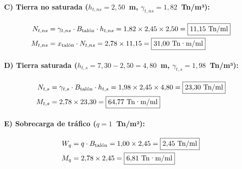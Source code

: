 \paragraph{C) Tierra no saturada ($h_{t,ns} = 2{,}50$~m, $\gamma_{t,ns} = 1{,}82$~Tn/m³):}

\begin{align*}
  N_{t,ns} &= \gamma_{t,ns} \cdot B_\text{talón} \cdot h_{t,ns}
            = 1{,}82 \times 2{,}45 \times 2{,}50
            = \boxed{11{,}15~\text{Tn/ml}} \\
  M_{t,ns} &= x_\text{talón} \cdot N_{t,ns}
            = 2{,}78 \times 11{,}15 = \boxed{31{,}00~\text{Tn·m/ml}}
\end{align*}

\paragraph{D) Tierra saturada ($h_{t,s} = 7{,}30 - 2{,}50 = 4{,}80$~m, $\gamma_{t,s} = 1{,}98$~Tn/m³):}

\begin{align*}
  N_{t,s} &= \gamma_{t,s} \cdot B_\text{talón} \cdot h_{t,s}
           = 1{,}98 \times 2{,}45 \times 4{,}80
           = \boxed{23{,}30~\text{Tn/ml}} \\
  M_{t,s} &= 2{,}78 \times 23{,}30 = \boxed{64{,}77~\text{Tn·m/ml}}
\end{align*}

\paragraph{E) Sobrecarga de tráfico ($q = 1$~Tn/m²):}

\begin{align*}
  W_q &= q \cdot B_\text{talón} = 1{,}00 \times 2{,}45
       = \boxed{2{,}45~\text{Tn/ml}} \\
  M_q &= 2{,}78 \times 2{,}45 = \boxed{6{,}81~\text{Tn·m/ml}}
\end{align*}

